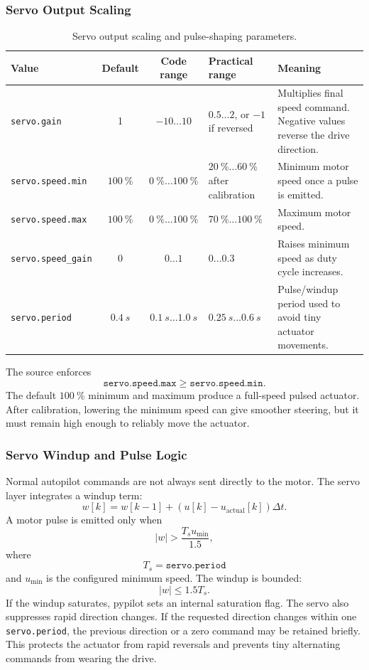 \documentclass[11pt,twocolumn]{article}
\newcommand{\abs}[1]{\left\lvert #1 \right\rvert}
\begin{document}
\subsubsection{Servo Output Scaling}
\begin{table}[t]
\centering
\caption{Servo output scaling and pulse-shaping parameters.}
\label{tab:pypilot-servo-scaling}
\begin{tabularx}{\textwidth}{Z{0.23\textwidth}c c Z{0.16\textwidth}Y}
\toprule
Value & Default & Code range & Practical range & Meaning \\
\midrule
\texttt{servo.gain} &
\num{1} &
\(\num{-10}\ldots\num{10}\) &
\(\num{0.5}\ldots\num{2}\), or \(-1\) if reversed &
Multiplies final speed command.  Negative values reverse the drive direction. \\
\texttt{servo.speed.min} &
\(\SI{100}{\percent}\) &
\(\SI{0}{\percent}\ldots\SI{100}{\percent}\) &
\(\SI{20}{\percent}\ldots\SI{60}{\percent}\) after calibration &
Minimum motor speed once a pulse is emitted. \\
\texttt{servo.speed.max} &
\(\SI{100}{\percent}\) &
\(\SI{0}{\percent}\ldots\SI{100}{\percent}\) &
\(\SI{70}{\percent}\ldots\SI{100}{\percent}\) &
Maximum motor speed. \\
\texttt{servo.speed\_gain} &
\num{0} &
\(\num{0}\ldots\num{1}\) &
\(\num{0}\ldots\num{0.3}\) &
Raises minimum speed as duty cycle increases. \\
\texttt{servo.period} &
\(\SI{0.4}{s}\) &
\(\SI{0.1}{s}\ldots\SI{1.0}{s}\) &
\(\SI{0.25}{s}\ldots\SI{0.6}{s}\) &
Pulse/windup period used to avoid tiny actuator movements. \\
\bottomrule
\end{tabularx}
\end{table}
The source enforces
\[
\texttt{servo.speed.max}
\ge
\texttt{servo.speed.min}.
\]
The default \(\SI{100}{\percent}\) minimum and maximum produce a
full-speed pulsed actuator.  After calibration, lowering the minimum speed
can give smoother steering, but it must remain high enough to reliably
move the actuator.
\subsubsection{Servo Windup and Pulse Logic}
Normal autopilot commands are not always sent directly to the motor.  The
servo layer integrates a windup term:
\[
w[k]
=
w[k-1]
+
\left(u[k]-u_{\mathrm{actual}}[k]\right)\Delta t .
\]
A motor pulse is emitted only when
\[
\abs{w}
>
\frac{T_s u_{\min}}{1.5},
\]
where
\[
T_s = \texttt{servo.period}
\]
and \(u_{\min}\) is the configured minimum speed.  The windup is bounded:
\[
\abs{w}
\le
1.5T_s .
\]
If the windup saturates, pypilot sets an internal saturation flag.
The servo also suppresses rapid direction changes.  If the requested
direction changes within one \texttt{servo.period}, the previous direction
or a zero command may be retained briefly.  This protects the actuator
from rapid reversals and prevents tiny alternating commands from wearing
the drive.
\end{document}
